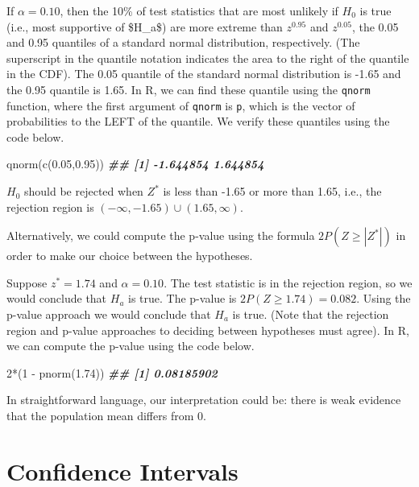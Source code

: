 \documentclass[
]{book}
\newenvironment{Shaded}{\begin{snugshade}}{\end{snugshade}}
\newcommand{\DecValTok}[1]{\textcolor[rgb]{0.00,0.00,0.81}{#1}}
\newcommand{\DocumentationTok}[1]{\textcolor[rgb]{0.56,0.35,0.01}{\textbf{\textit{#1}}}}
\newcommand{\FloatTok}[1]{\textcolor[rgb]{0.00,0.00,0.81}{#1}}
\newcommand{\FunctionTok}[1]{\textcolor[rgb]{0.00,0.00,0.00}{#1}}
\newcommand{\NormalTok}[1]{#1}
\newcommand{\SpecialCharTok}[1]{\textcolor[rgb]{0.00,0.00,0.00}{#1}}
\theoremstyle{definition}
\theoremstyle{definition}
\theoremstyle{definition}
\theoremstyle{definition}
\theoremstyle{remark}
\begin{document}
If
\(\alpha=0.10\), then the 10\% of test statistics that are most unlikely if \(H_0\)
is true (i.e., most supportive of \$H\_a\$) are more extreme than
\(z^{0.95}\) and \(z^{0.05}\), the 0.05 and 0.95 quantiles of a standard
normal distribution, respectively. (The superscript in the quantile
notation indicates the area to the right of the quantile in the CDF).
The 0.05 quantile of the standard normal distribution is -1.65 and the
0.95 quantile is 1.65. In R, we can find these quantile using the
\texttt{qnorm} function, where the first argument of \texttt{qnorm} is \texttt{p}, which is
the vector of probabilities to the LEFT of the quantile. We verify these
quantiles using the code below.

\begin{Shaded}
\begin{Highlighting}[]
\FunctionTok{qnorm}\NormalTok{(}\FunctionTok{c}\NormalTok{(}\FloatTok{0.05}\NormalTok{,}\FloatTok{0.95}\NormalTok{))}
\DocumentationTok{\#\# [1] {-}1.644854  1.644854}
\end{Highlighting}
\end{Shaded}

\(H_0\) should be rejected when \(Z^*\) is less than -1.65 or more than
1.65, i.e., the rejection region is \((-\infty, -1.65)\cup(1.65,\infty)\).

Alternatively, we could compute the p-value using the formula
\(2P(Z\geq |Z^*|)\) in order to make our choice between the hypotheses.

Suppose \(z^*=1.74\) and \(\alpha=0.10\). The test statistic is in the rejection region, so we would conclude that \(H_a\)
is true. The p-value is \(2P(Z\geq 1.74)=0.082\). Using the p-value approach we would conclude that \(H_a\) is true. (Note that the rejection region and p-value approaches to deciding between hypotheses must agree). In R, we can compute the p-value using the code below.

\begin{Shaded}
\begin{Highlighting}[]
\DecValTok{2}\SpecialCharTok{*}\NormalTok{(}\DecValTok{1} \SpecialCharTok{{-}} \FunctionTok{pnorm}\NormalTok{(}\FloatTok{1.74}\NormalTok{))}
\DocumentationTok{\#\# [1] 0.08185902}
\end{Highlighting}
\end{Shaded}

In straightforward language, our interpretation could be: there is weak evidence that the population mean differs from 0.

\hypertarget{confidence-intervals}{%
\section{Confidence Intervals}\label{confidence-intervals}}
\end{document}
